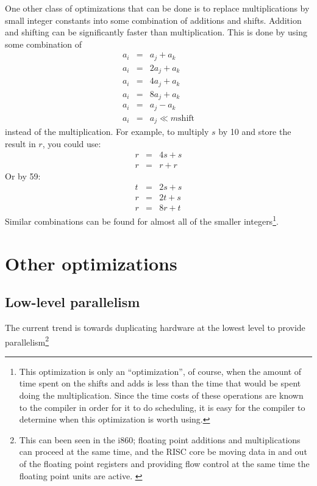 One other class of optimizations that can be done is to replace
multiplications by small integer constants into some combination of
additions and shifts.  Addition and shifting can be significantly faster
than multiplication.  This is done by using some combination of
\begin{eqnarray*}
a_i & = & a_j + a_k \\
a_i & = & 2a_j + a_k \\
a_i & = & 4a_j + a_k \\
a_i & = & 8a_j + a_k \\
a_i & = & a_j - a_k \\
a_i & = & a_j \ll m \mbox{shift}
\end{eqnarray*}
instead of the multiplication.  For example, to multiply $s$ by 10 and store
the result in $r$, you could use:
\begin{eqnarray*}
r & = & 4s + s\\
r & = & r + r
\end{eqnarray*}
Or by 59:
\begin{eqnarray*}
t & = & 2s + s \\
r & = & 2t + s \\
r & = & 8r + t
\end{eqnarray*}
Similar combinations can be found for almost all of the smaller
integers\footnote{This optimization is only an ``optimization'', of course,
when the amount of time spent on the shifts and adds is less than the time
that would be spent doing the multiplication.  Since the time costs of these
operations are known to the compiler in order for it to do scheduling, it is
easy for the compiler to determine when this optimization is worth using.}.
\cite{magenheimer:precision}

\section{Other optimizations}

\subsection{Low-level parallelism}

The current trend is towards duplicating hardware at the lowest level to
provide parallelism\footnote{This can been seen in the i860; floating point
additions and multiplications can proceed at the same time, and the RISC
core be moving data in and out of the floating point registers and providing
flow control at the same time the floating point units are active. \cite{byte:i860}}

